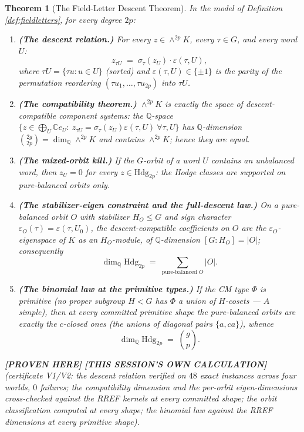 \documentclass[11pt]{article}
\newtheorem{theorem}{Theorem}
\newcommand{\PROVEN}{\textbf{[PROVEN HERE]}}
\newcommand{\MINE}{\textbf{[THIS SESSION'S OWN CALCULATION]}}
\newcommand{\Q}{\mathbb{Q}}
\newcommand{\C}{\mathbb{C}}
\newcommand{\Hdg}{\mathrm{Hdg}}
\begin{document}
\begin{theorem}[The Field-Letter Descent Theorem]\label{thm:s14descent}
In the model of Definition \ref{def:fieldletters}, for every degree $2p$:
\begin{enumerate}[label=(\roman*)]
\item \textbf{(The descent relation.)} For every $z\in\wedge^{2p}K$, every
$\tau\in G$, and every word $U$:
\[
z_{\tau U}\;=\;\sigma_\tau\!\left(z_U\right)\cdot\varepsilon(\tau,U),
\]
where $\tau U=\{\tau u:u\in U\}$ (sorted) and $\varepsilon(\tau,U)\in\{\pm1\}$ is
the parity of the permutation reordering $(\tau u_1,\dots,\tau u_{2p})$ into
$\tau U$.
\item \textbf{(The compatibility theorem.)} $\wedge^{2p}K$ is \emph{exactly} the
space of descent-compatible component systems: the $\Q$-space
$\{z\in\bigoplus_U \C e_U:\ z_{\tau U}=\sigma_\tau(z_U)\varepsilon(\tau,U)\ \forall\tau,U\}$
has $\Q$-dimension $\binom{2g}{2p}=\dim_\Q\wedge^{2p}K$ and contains
$\wedge^{2p}K$; hence they are equal.
\item \textbf{(The mixed-orbit kill.)} If the $G$-orbit of a word $U$ contains an
unbalanced word, then $z_U=0$ for every $z\in\Hdg_{2p}$: the Hodge classes are
supported on \emph{pure-balanced} orbits only.
\item \textbf{(The stabilizer-eigen constraint and the full-descent law.)} On a
pure-balanced orbit $O$ with stabilizer $H_O\le G$ and sign character
$\varepsilon_O(\tau)=\varepsilon(\tau,U_0)$, the descent-compatible coefficients
on $O$ are the $\varepsilon_O$-eigenspace of $K$ as an $H_O$-module, of
$\Q$-dimension $[G:H_O]=\left|O\right|$; consequently
\[
\dim_\Q\Hdg_{2p}\;=\;\sum_{\text{pure-balanced }O}\left|O\right|.
\]
\item \textbf{(The binomial law at the primitive types.)} If the CM type $\Phi$
is primitive (no proper subgroup $H<G$ has $\Phi$ a union of $H$-cosets --- $A$
simple), then at every committed primitive shape the pure-balanced orbits are
exactly the $c$-closed ones (the unions of diagonal pairs $\{a,ca\}$), whence
\[
\dim_\Q\Hdg_{2p}\;=\;\binom{g}{p}.
\]
\end{enumerate}
\PROVEN{} \MINE{} (certificate V1/V2: the descent relation verified on
$48$ exact instances across four worlds, $0$ failures; the compatibility
dimension and the per-orbit eigen-dimensions cross-checked against the RREF
kernels at every committed shape; the orbit classification computed at every
shape; the binomial law against the RREF dimensions at every primitive shape).
\end{theorem}
\end{document}
